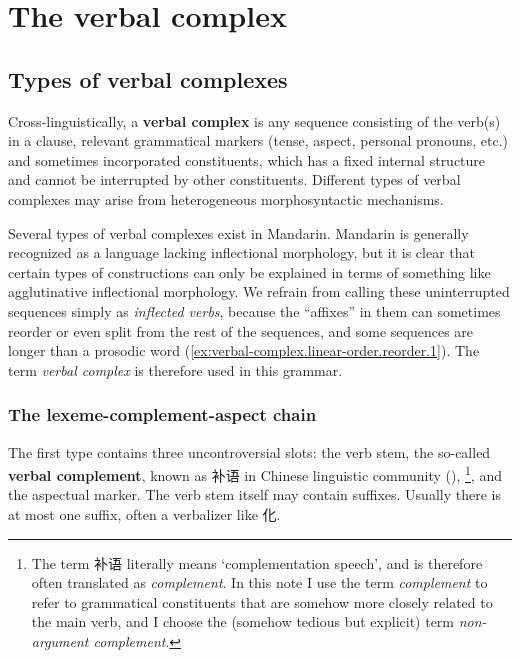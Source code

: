 \documentclass[UTF8, a4paper, oneside, scheme=plain, 12pt]{ctexrep}
\newcommand*{\concept}[1]{\textbf{#1}}
\newcommand*{\term}[1]{\emph{#1}}
\newcommand{\translate}[1]{`#1'}
\begin{document}
\chapter{The verbal complex}\label{chap:verbal-complex}

\section{Types of verbal complexes}\label{sec:verbal-complex.linear-order}

Cross-linguistically, a \concept{verbal complex} is
any sequence consisting of the verb(s) in a clause,
relevant grammatical markers (tense, aspect, personal pronouns, etc.)
and sometimes incorporated constituents,
which has a fixed internal structure and cannot be interrupted by other constituents.
Different types of verbal complexes may arise from
heterogeneous morphosyntactic mechanisms.

Several types of verbal complexes exist in Mandarin.
Mandarin is generally recognized as a language lacking inflectional morphology,
but it is clear that certain types of constructions
can only be explained in terms of something like agglutinative inflectional morphology.
We refrain from calling these uninterrupted sequences simply as \term{inflected verbs},
because the ``affixes'' in them can sometimes reorder or even split from the rest of the sequences,
and some sequences are longer than a prosodic word
(\ref{ex:verbal-complex.linear-order.reorder.1}).
The term \term{verbal complex} is therefore used in this grammar.

\subsection{The lexeme-complement-aspect chain}\label{sec:verbal-complex.v-c-a}

The first type contains three uncontroversial slots:
the verb stem,
the so-called \concept{verbal complement},
known as 补语 in Chinese linguistic community (),%
\footnote{
    The term 补语 literally means \translate{complementation speech}, 
    and is therefore often translated as \term{complement}.
    In this note I use the term \term{complement}
    to refer to grammatical constituents that are somehow more closely 
    related to the main verb, 
    and I choose the (somehow tedious but explicit) term 
    \term{non-argument complement}.
},
and the aspectual marker.
The verb stem itself may contain suffixes.
Usually there is at most one suffix, often a verbalizer like 化.
\end{document}
